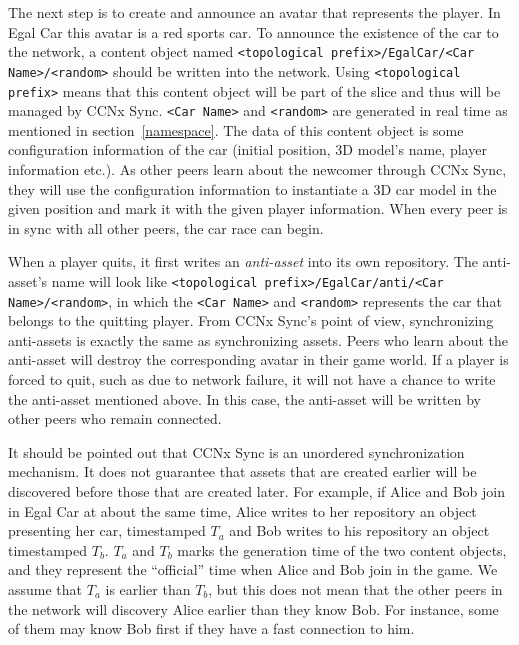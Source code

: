 \documentclass{article}
\begin{document}
The next step is to create and announce an avatar that represents the player. In Egal Car this avatar is a red sports car. To announce the existence of the car to the network, a content object named \texttt{<topological prefix>/EgalCar/<Car Name>/<random>} should be written into the network. Using \texttt{<topological prefix>} means that this content object will be part of the slice and thus will be managed by CCNx Sync. \texttt{<Car Name>} and \texttt{<random>} are generated in real time as mentioned in section~\ref{namespace}. The data of this content object is some configuration information of the car (initial position, 3D model's name, player information etc.). As other peers learn about the newcomer through CCNx Sync, they will use the configuration information to instantiate a 3D car model in the given position and mark it with the given player information. When every peer is in sync with all other peers, the car race can begin.

When a player quits, it first writes an \emph{anti-asset} into its own repository. The anti-asset's name will look like \texttt{<topological prefix>/EgalCar/anti/<Car Name>/<random>}, in which the \texttt{<Car Name>} and \texttt{<random>} represents the car that belongs to the quitting player. From CCNx Sync's point of view, synchronizing anti-assets is exactly the same as synchronizing assets. Peers who learn about the anti-asset will destroy the corresponding avatar in their game world. If a player is forced to quit, such as due to network failure, it will not have a chance to write the anti-asset mentioned above. In this case, the anti-asset will be written by other peers who remain connected. 

It should be pointed out that CCNx Sync is an unordered synchronization mechanism. It does not guarantee that assets that are created earlier will be discovered before those that are created later. For example, if Alice and Bob join in Egal Car at about the same time, Alice writes to her repository an object presenting her car, timestamped $T_a$ and Bob writes to his repository an object timestamped $T_b$. $T_a$ and $T_b$ marks the generation time of the two content objects, and they represent the ``official'' time when Alice and Bob join in the game. We assume that $T_a$ is earlier than $T_b$, but this does not mean that the other peers in the network will discovery Alice earlier than they know Bob. For instance, some of them may know Bob first if they have a fast connection to him.
\end{document}

